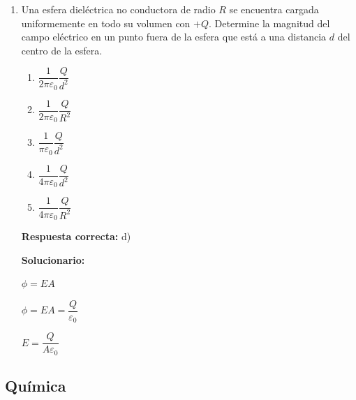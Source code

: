 \begin{enumerate}[resume]
	\vspace{2mm}
	\textbf{Solucionario:}

	$Q_{\text{g Hielo}} = -Q_{\text{perdido H}_2\text{O}}$

	$m_{\text{Hielo}} L_f = - c_{\text{H}_2\text{O}} m_{\text{H}_2\text{O}}  AT$


	$m_{\text{H}_2\text{O}} = - \dfrac{m_{\text{Hielo}} L_f}{c_{\text{H}_2\text{O}}  AT}$


	$m_{\text{H}_2\text{O}} = - \dfrac{(40)(10\%)(80)}{(1)(0-8)} = \dfrac{(4)(80)}{8}$


	$m_{\text{H}_2\text{O}} = \fbox{40 \text{ g}}$

	\vspace{6mm}

	\item Una esfera dieléctrica no conductora de radio $R$ se encuentra cargada uniformemente en todo su volumen con $+Q$. Determine la magnitud del campo eléctrico en un punto fuera de la esfera que está a una distancia $d$ del centro de la esfera.
	\begin{enumerate}[label=\alph*)]
		\item $\dfrac{1}{2\pi\varepsilon_0} \dfrac{Q}{d^2}$
		\item $\dfrac{1}{2\pi\varepsilon_0} \dfrac{Q}{R^2}$
		\item $\dfrac{1}{\pi\varepsilon_0} \dfrac{Q}{d^2}$
		\item $\dfrac{1}{4\pi\varepsilon_0} \dfrac{Q}{d^2}$
		\item $\dfrac{1}{4\pi\varepsilon_0} \dfrac{Q}{R^2}$
	\end{enumerate}
	\textbf{Respuesta correcta:} d)

	\vspace{2mm}
	\textbf{Solucionario:}

	$\phi = E A$

	$\phi = E A = \dfrac{Q}{\varepsilon_0}$

	$E = \dfrac{Q}{A \varepsilon_0}$\


	\vspace{6mm}

\end{enumerate}





\subsection*{Química}

